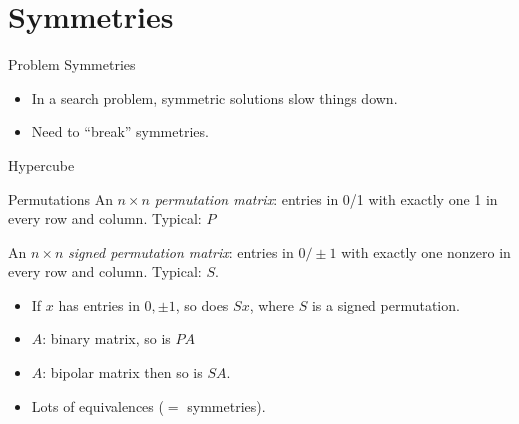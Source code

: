 
\section{Symmetries}
\label{sec:symm}
\begin{frame}{Problem Symmetries}
  \begin{itemize}
  \item In a search problem, symmetric solutions slow things down.
  \item Need to ``break'' symmetries.
  \end{itemize}
\end{frame}
\begin{frame}{Hypercube}
  \begin{block}{Permutations}
    An $n \times n$ \emph{permutation matrix}: entries in 0/1 with
    exactly one 1 in every row and column.  Typical: $P$

    An $n \times n$ \emph{signed permutation matrix}: entries in
    $0/\pm1$ with exactly one nonzero in every row and column. Typical:
    $S$. 
  \end{block}
  \begin{itemize}
  \item If $x$ has entries in $0,\pm 1$, so does $S x$, where $S$ is a
    signed permutation.
  \item $A$: binary matrix, so is $P A$
  \item $A$: bipolar matrix then so is $S A$.
  \item Lots of equivalences ($=$ symmetries).
  \end{itemize}
\end{frame}
